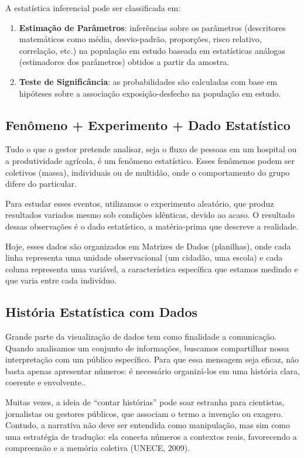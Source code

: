 A estatística inferencial pode ser classificada em:

\begin{enumerate}
  \item \textbf{Estimação de Parâmetros}: inferências sobre os parâmetros (descritores matemáticos como média, desvio-padrão, proporções, risco relativo, correlação, etc.) na população em estudo baseada em estatísticas análogas (estimadores dos parâmetros) obtidos a partir da amostra.
  \item \textbf{Teste de Significância}: as probabilidades são calculadas com base em hi\-pó\-te\-ses sobre a associação exposição-desfecho na população em estudo.
\end{enumerate}

\subsection{Fenômeno + Experimento + Dado Estatístico}

Tudo o que o gestor pretende analisar, seja o fluxo de pessoas em um hospital ou a produtividade agrícola, é um fenômeno estatístico. Esses fenômenos podem ser coletivos (massa), individuais ou de multidão, onde o comportamento do grupo difere do particular. \vskip0.3cm

Para estudar esses eventos, utilizamos o experimento aleatório, que produz resultados variados mesmo sob condições idênticas, devido ao acaso. O resultado dessas observações é o dado estatístico, a matéria-prima que descreve a realidade. \vskip0.3cm

Hoje, esses dados são organizados em Matrizes de Dados (planilhas), onde cada linha representa uma unidade observacional (um cidadão, uma escola) e cada coluna representa uma variável, a característica específica que estamos medindo e que varia entre cada indivíduo.


\subsection{História Estatística com Dados}

Grande parte da visualização de dados tem como finalidade a comunicação. Quando analisamos um conjunto de informações, buscamos compartilhar nossa interpretação com um público específico. Para que essa mensagem seja eficaz, não basta apenas apresentar números: é necessário organizá-los em uma história clara, coerente e envolvente.. \vskip0.3cm

Muitas vezes, a ideia de “contar histórias” pode soar estranha para cientistas, jornalistas ou gestores públicos, que associam o termo a invenção ou exagero. Contudo, a narrativa não deve ser entendida como manipulação, mas sim como uma estratégia de tradução: ela conecta números a contextos reais, favorecendo a compreensão e a memória coletiva (UNECE, 2009). \vskip0.3cm

